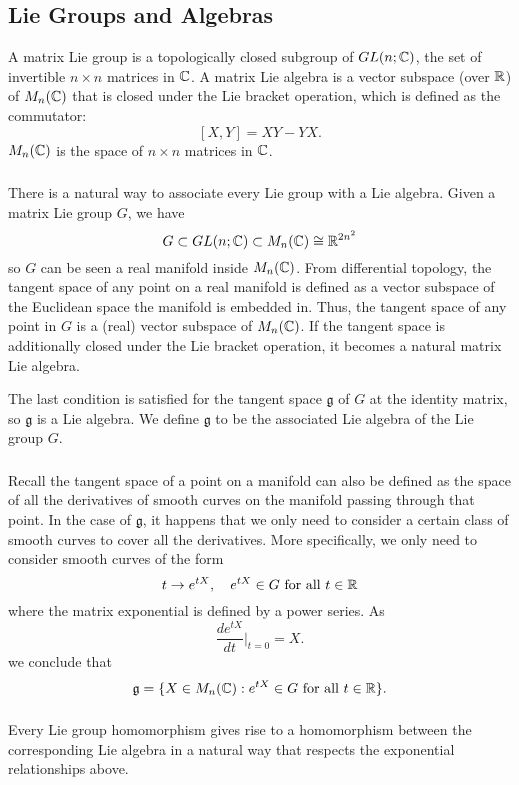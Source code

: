 \subsection{Lie Groups and Algebras}
A matrix Lie group is a topologically closed subgroup of $GL(n; {\mathbb C})$, the set of invertible $n \times n$ matrices in ${\mathbb C}$. A matrix Lie algebra is a vector subspace (over ${\mathbb R}$) of $M_n({\mathbb C})$ that is closed under the Lie bracket operation, which is defined as the commutator:
\[
    [X, Y] = XY - YX.
\]
$M_n({\mathbb C})$ is the space of $n \times n$ matrices in ${\mathbb C}$.

\subsubsection{}
There is a natural way to associate every Lie group with a Lie algebra. Given a matrix Lie group $G$, we have
\[
    G \subset GL(n; {\mathbb C}) \subset M_n({\mathbb C}) \cong {\mathbb R}^{2n^2}
\]
so $G$ can be seen a real manifold inside $M_n({\mathbb C})$. From differential topology, the tangent space of any point on a real manifold is defined as a vector subspace of the Euclidean space the manifold is embedded in. Thus, the tangent space of any point in $G$ is a (real) vector subspace of $M_n({\mathbb C})$. If the tangent space is additionally closed under the Lie bracket operation, it becomes a natural matrix Lie algebra.

The last condition is satisfied for the tangent space $\mathfrak g$ of $G$ at the identity matrix, so $\mathfrak g$ is a Lie algebra. We define $\mathfrak g$ to be the associated Lie algebra of the Lie group $G$.

\subsubsection{}
Recall the tangent space of a point on a manifold can also be defined as the space of all the derivatives of smooth curves on the manifold passing through that point. In the case of $\mathfrak g$, it happens that we only need to consider a certain class of smooth curves to cover all the derivatives. More specifically, we only need to consider smooth curves of the form
\[
    t \rightarrow e^{tX}, \quad e^{tX} \in G \text{ for all } t \in {\mathbb R}
\]
where the matrix exponential is defined by a power series. As
\[
    \frac{d e^{tX}}{dt} \Bigr|_{t = 0} = X.
\]
we conclude that
\[
    \mathfrak g = \{X \in M_n({\mathbb C}) : e^{tX} \in G \text{ for all } t \in {\mathbb R}\}.
\]

\subsubsection{}
Every Lie group homomorphism gives rise to a homomorphism between the corresponding Lie algebra in a natural way that respects the exponential relationships above.
